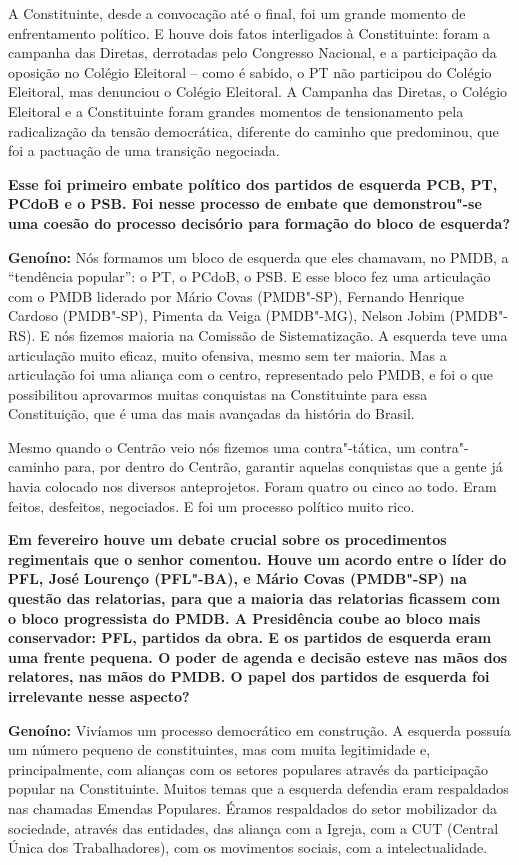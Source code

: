 A Constituinte, desde a convocação até o final, foi um grande momento de
enfrentamento político. E houve dois fatos interligados à Constituinte:
foram a campanha das Diretas, derrotadas pelo Congresso Nacional, e a
participação da oposição no Colégio Eleitoral -- como é sabido, o PT não
participou do Colégio Eleitoral, mas denunciou o Colégio Eleitoral. A
Campanha das Diretas, o Colégio Eleitoral e a Constituinte foram grandes
momentos de tensionamento pela radicalização da tensão democrática,
diferente do caminho que predominou, que foi a pactuação de uma
transição negociada.

\textbf{Esse foi primeiro embate político dos partidos de esquerda PCB,
PT, PCdoB e o PSB. Foi nesse processo de embate que demonstrou"-se uma
coesão do processo decisório para formação do bloco de esquerda?}

\textbf{Genoíno:} Nós formamos um bloco de esquerda que eles chamavam,
no PMDB, a ``tendência popular'': o PT, o PCdoB, o PSB. E esse bloco fez
uma articulação com o PMDB liderado por Mário Covas (PMDB"-SP), Fernando
Henrique Cardoso (PMDB"-SP), Pimenta da Veiga (PMDB"-MG), Nelson Jobim
(PMDB"-RS). E nós fizemos maioria na Comissão de Sistematização. A
esquerda teve uma articulação muito eficaz, muito ofensiva, mesmo sem
ter maioria. Mas a articulação foi uma aliança com o centro,
representado pelo PMDB, e foi o que possibilitou aprovarmos muitas
conquistas na Constituinte para essa Constituição, que é uma das mais
avançadas da história do Brasil.

Mesmo quando o Centrão veio nós fizemos uma contra"-tática, um
contra"-caminho para, por dentro do Centrão, garantir aquelas conquistas
que a gente já havia colocado nos diversos anteprojetos. Foram quatro ou
cinco ao todo. Eram feitos, desfeitos, negociados. E foi um processo
político muito rico.

\textbf{Em fevereiro houve um debate crucial sobre os procedimentos
regimentais que o senhor comentou. Houve um acordo entre o líder do PFL,
José Lourenço (PFL"-BA), e Mário Covas (PMDB"-SP) na questão das
relatorias, para que a maioria das relatorias ficassem com o bloco
progressista do PMDB. A Presidência coube ao bloco mais conservador:
PFL, partidos da obra. E os partidos de esquerda eram uma frente
pequena. O poder de agenda e decisão esteve nas mãos dos relatores, nas
mãos do PMDB. O papel dos partidos de esquerda foi irrelevante nesse
aspecto?}

\textbf{Genoíno:} Vivíamos um processo democrático em construção. A
esquerda possuía um número pequeno de constituintes, mas com muita
legitimidade e, principalmente, com alianças com os setores populares
através da participação popular na Constituinte. Muitos temas que a
esquerda defendia eram respaldados nas chamadas Emendas Populares.
Éramos respaldados do setor mobilizador da sociedade, através das
entidades, das aliança com a Igreja, com a CUT (Central Única dos
Trabalhadores), com os movimentos sociais, com a intelectualidade.


